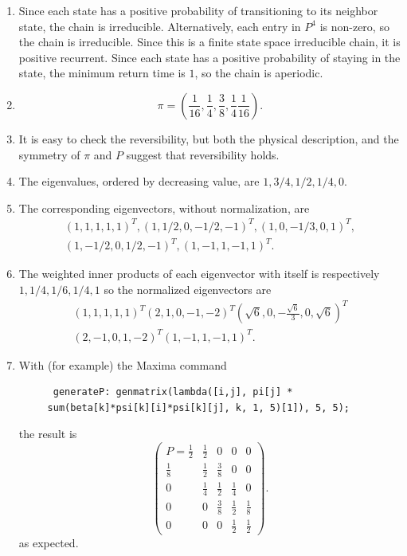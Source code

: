 \documentclass[12pt]{article}
\begin{document}
\begin{solution}
    \begin{enumerate}[label=(\alph*)]
    \item
        Since each state has a positive probability of transitioning to
        its neighbor state, the chain is irreducible.  Alternatively,
        each entry in \( P^4 \) is non-zero, so the chain is
        irreducible.  Since this is a finite state space irreducible
        chain, it is positive recurrent.  Since each state has a
        positive probability of staying in the state, the minimum return
        time is \( 1 \), so the chain is aperiodic.
    \item
        \[
            \pi = \left( \frac{1}{16}, \frac{1}{4}, \frac{3}{8}, \frac{1}
            {4} \frac{1}{16} \right).
        \]
    \item
        It is easy to check the reversibility, but both the physical
        description, and the symmetry of \( \pi \) and \( P \) suggest
        that reversibility holds.
    \item
        The eigenvalues, ordered by decreasing value, are \(
        1,3/4,1/2,1/4,0 \).
    \item
        The corresponding eigenvectors, without normalization, are
        \begin{multline*}
          (1,1,1,1,1)^T,(1,1/2,0,-1/2,-1)^T,(1,0,-1/3,0,1)^T, \\
          (1,-1/2,0,1/2,-1)^T, (1,-1,1,-1,1)^T.
        \end{multline*}
    \item
        The weighted inner products of each eigenvector with itself is
        respectively \( 1, 1/4, 1/6, 1/4, 1 \) so the normalized
        eigenvectors are
        \begin{multline*}
            \left( 1,1,1,1,1\right)^T \left( 2,1,0,-1,-2\right)^T \left(
            \sqrt{6},0,-\frac{\sqrt{6}}{3},0,\sqrt{6}\right)^T \\\left(
            2,-1,0,1,-2\right)^T \left( 1,-1,1,-1,1\right)^T.
\end{multline*}
    \item
        With (for example) the Maxima command
\begin{verbatim}
      generateP: genmatrix(lambda([i,j], pi[j] *
     sum(beta[k]*psi[k][i]*psi[k][j], k, 1, 5)[1]), 5, 5);
\end{verbatim}
        the result is
        \[
            \begin{pmatrix}
                P = \frac{1}{2} & \frac{1}{2} & 0 & 0 & 0\\
                \frac{1}{8} & \frac{1}{2} & \frac{3}{8} & 0 & 0\\
                0 & \frac{1}{4} & \frac{1}{2} & \frac{1}{4} & 0\\
                0 & 0 & \frac{3}{8} & \frac{1}{2} & \frac{1}{8}\\
                0 & 0 & 0 & \frac{1}{2} & \frac{1}{2}
            \end{pmatrix}
            .
        \] as expected.
\end{enumerate}
\end{solution}
\end{document}
